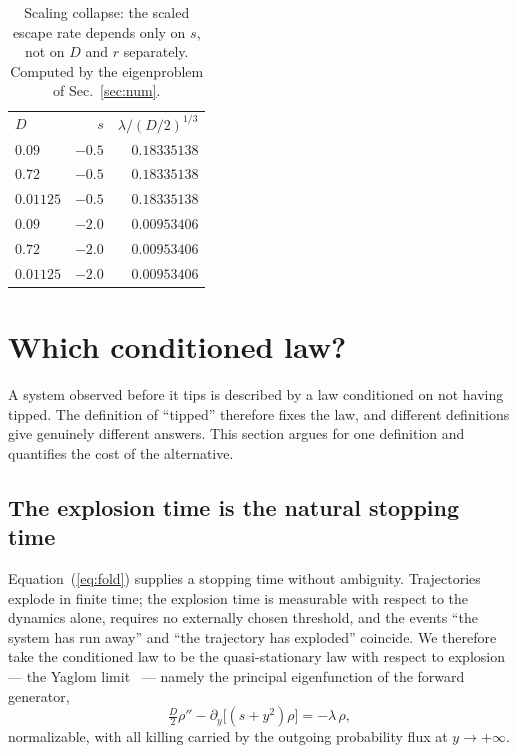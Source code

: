 \documentclass[%
 twocolumn,
 superscriptaddress,
 amsmath,amssymb,
 aps,
 pre,
 floatfix,
]{revtex4-2}
\begin{document}
\begin{table}[b]
\caption{\label{tab:collapse}%
Scaling collapse: the scaled escape rate depends only on $s$, not on $D$ and $r$ separately.  Computed by the eigenproblem of Sec.~\ref{sec:num}.}
\begin{ruledtabular}
\begin{tabular}{lrr}
$D$ & $s$ & $\lambda/(D/2)^{1/3}$ \\
\colrule
$0.09$    & $-0.5$ & $0.18335138$ \\
$0.72$    & $-0.5$ & $0.18335138$ \\
$0.01125$ & $-0.5$ & $0.18335138$ \\
$0.09$    & $-2.0$ & $0.00953406$ \\
$0.72$    & $-2.0$ & $0.00953406$ \\
$0.01125$ & $-2.0$ & $0.00953406$ \\
\end{tabular}
\end{ruledtabular}
\end{table}

\section{\label{sec:law}Which conditioned law?}

A system observed before it tips is described by a law conditioned on not having tipped.  The definition of ``tipped'' therefore fixes the law, and different definitions give genuinely different answers.  This section argues for one definition and quantifies the cost of the alternative.

\subsection{The explosion time is the natural stopping time}

Equation~(\ref{eq:fold}) supplies a stopping time without ambiguity.  Trajectories explode in finite time; the explosion time is measurable with respect to the dynamics alone, requires no externally chosen threshold, and the events ``the system has run away'' and ``the trajectory has exploded'' coincide.  We therefore take the conditioned law to be the quasi-stationary law with respect to explosion --- the Yaglom limit~\cite{MeleardVillemonais2012,Collet2013} --- namely the principal eigenfunction of the forward generator,
\begin{equation}
\label{eq:killed}
\tfrac D2\rho''-\partial_y\bigl[(s+y^2)\rho\bigr]=-\lambda\,\rho ,
\end{equation}
normalizable, with all killing carried by the outgoing probability flux at $y\to+\infty$.
\end{document}
